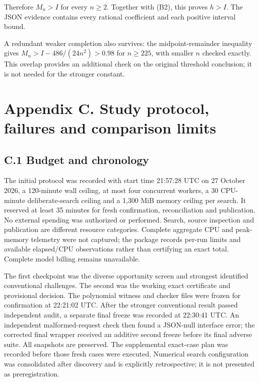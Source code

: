 \documentclass[11pt,a4paper]{article}
\begin{document}
Therefore \(M_n>I\) for every \(n\ge2\). Together with (B2), this proves
\(h>I\). The JSON evidence contains every rational coefficient and each
positive interval bound.

A redundant weaker completion also survives: the midpoint-remainder
inequality gives \(M_n>I-486/(24n^2)>0.98\) for \(n\ge225\), with
smaller \(n\) checked exactly. This overlap provides an additional check
on the original threshold conclusion; it is not needed for the stronger
constant.


\hypertarget{appendix-c.-study-protocol-failures-and-comparison-limits}{%
\section{Appendix C. Study protocol, failures and comparison
limits}\label{appendix-c.-study-protocol-failures-and-comparison-limits}}


\hypertarget{c.1-budget-and-chronology}{%
\subsection{C.1 Budget and chronology}\label{c.1-budget-and-chronology}}

The initial protocol was recorded with start time 21:57:28 UTC on 27
October 2026, a 120-minute wall ceiling, at most four concurrent
workers, a 30 CPU-minute deliberate-search ceiling and a 1,300 MiB
memory ceiling per search. It reserved at least 35 minutes for fresh
confirmation, reconciliation and publication. No external spending was
authorized or performed. Search, source inspection and publication are
different resource categories. Complete aggregate CPU and peak-memory
telemetry were not captured; the package records per-run limits and
available elapsed/CPU observations rather than certifying an exact
total. Complete model billing remains unavailable.

The first checkpoint was the diverse opportunity screen and strongest
identified conventional challenges. The second was the working exact
certificate and provisional decision. The polynomial witness and checker
files were frozen for confirmation at 22:21:02 UTC. After the stronger
conventional result passed independent audit, a separate final freeze
was recorded at 22:30:41 UTC. An independent malformed-request check
then found a JSON-null interface error; the corrected final wrapper
received an additive second freeze before its final adverse suite. All
snapshots are preserved. The supplemental exact-case plan was recorded
before those fresh cases were executed. Numerical search configuration
was consolidated after discovery and is explicitly retrospective; it is
not presented as preregistration.
\end{document}
